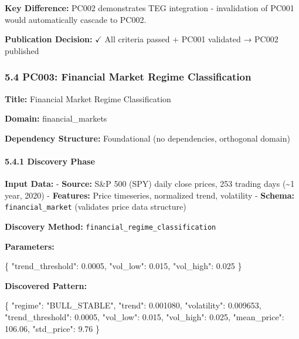\documentclass[
]{article}
\newenvironment{Shaded}{}{}
\newcommand{\DataTypeTok}[1]{\textcolor[rgb]{0.56,0.13,0.00}{#1}}
\newcommand{\FloatTok}[1]{\textcolor[rgb]{0.25,0.63,0.44}{#1}}
\newcommand{\FunctionTok}[1]{\textcolor[rgb]{0.02,0.16,0.49}{#1}}
\newcommand{\StringTok}[1]{\textcolor[rgb]{0.25,0.44,0.63}{#1}}
\begin{document}
\textbf{Key Difference:} PC002 demonstrates TEG integration -
invalidation of PC001 would automatically cascade to PC002.

\textbf{Publication Decision:} $\checkmark$ All criteria passed + PC001 validated →
PC002 published

\subsubsection{5.4 PC003: Financial Market Regime
Classification}\label{pc003-financial-market-regime-classification}

\textbf{Title:} Financial Market Regime Classification

\textbf{Domain:} financial\_markets

\textbf{Dependency Structure:} Foundational (no dependencies, orthogonal
domain)

\paragraph{5.4.1 Discovery Phase}\label{discovery-phase-1}

\textbf{Input Data:} - \textbf{Source:} S\&P 500 (SPY) daily close
prices, 253 trading days (\textasciitilde1 year, 2020) -
\textbf{Features:} Price timeseries, normalized trend, volatility -
\textbf{Schema:} \texttt{financial\_market} (validates price data
structure)

\textbf{Discovery Method:} \texttt{financial\_regime\_classification}

\textbf{Parameters:}

\begin{Shaded}
\begin{Highlighting}[]
\FunctionTok{\{}
  \DataTypeTok{"trend\_threshold"}\FunctionTok{:} \FloatTok{0.0005}\FunctionTok{,}
  \DataTypeTok{"vol\_low"}\FunctionTok{:} \FloatTok{0.015}\FunctionTok{,}
  \DataTypeTok{"vol\_high"}\FunctionTok{:} \FloatTok{0.025}
\FunctionTok{\}}
\end{Highlighting}
\end{Shaded}

\textbf{Discovered Pattern:}

\begin{Shaded}
\begin{Highlighting}[]
\FunctionTok{\{}
  \DataTypeTok{"regime"}\FunctionTok{:} \StringTok{"BULL\_STABLE"}\FunctionTok{,}
  \DataTypeTok{"trend"}\FunctionTok{:} \FloatTok{0.001080}\FunctionTok{,}
  \DataTypeTok{"volatility"}\FunctionTok{:} \FloatTok{0.009653}\FunctionTok{,}
  \DataTypeTok{"trend\_threshold"}\FunctionTok{:} \FloatTok{0.0005}\FunctionTok{,}
  \DataTypeTok{"vol\_low"}\FunctionTok{:} \FloatTok{0.015}\FunctionTok{,}
  \DataTypeTok{"vol\_high"}\FunctionTok{:} \FloatTok{0.025}\FunctionTok{,}
  \DataTypeTok{"mean\_price"}\FunctionTok{:} \FloatTok{106.06}\FunctionTok{,}
  \DataTypeTok{"std\_price"}\FunctionTok{:} \FloatTok{9.76}
\FunctionTok{\}}
\end{Highlighting}
\end{Shaded}
\end{document}

